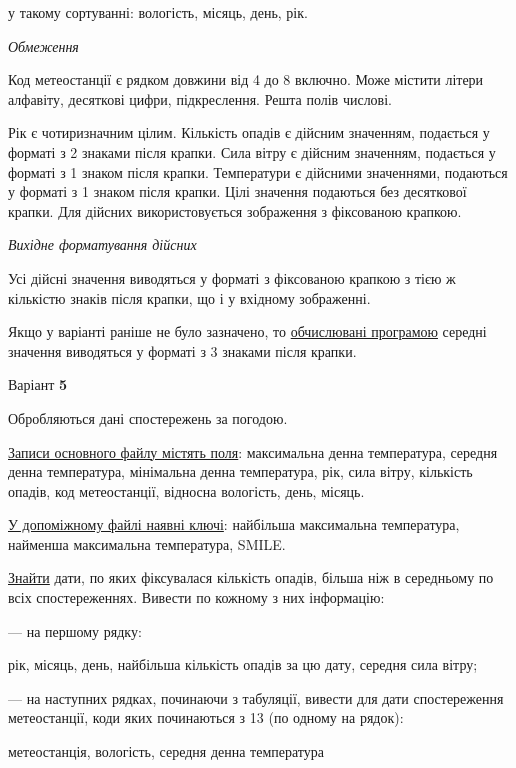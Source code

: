 \documentclass[11pt, ukrainian]{article}
\begin{document}
{\noindent}у такому сортуванні: вологість, місяць, день, рік.


\bigskip\textit{Обмеження}

Код метеостанції є рядком довжини від 4 до 8 включно.
Може містити літери алфавіту, десяткові цифри, підкреслення. Решта полів числові.

Рік є чотиризначним цілим.
Кількість опадів є дійсним значенням, подається у форматі з 2 знаками після крапки.
Сила вітру є дійсним значенням, подається у форматі з 1 знаком після крапки.
Температури є дійсними значеннями, подаються у форматі з 1 знаком після крапки.
Цілі значення подаються без десяткової крапки.
Для дійсних використовується зображення з фіксованою крапкою.

\textit{Вихідне форматування дійсних}

Усі дійсні значення виводяться у форматі з фіксованою крапкою з тією ж кількістю знаків після крапки, що і у вхідному зображенні.

Якщо у варіанті раніше не було зазначено, то \underline{обчислювані програмою} середні значення виводяться у форматі з 3 знаками після крапки.


\par
\newpage
{\center Варіант  \No \textbf { 5 }\par}
\bigskip
Обробляються дані спостережень за погодою. 

\underline{Записи основного файлу містять поля}: максимальна денна температура, середня денна температура, мінімальна денна температура, рік, сила вітру, кількість опадів, код метеостанції, відносна вологість, день, місяць.

\underline{У допоміжному файлі наявні ключі}: найбільша максимальна температура, найменша максимальна температура, SMILE.

\underline{Знайти} дати, по яких фіксувалася кількість опадів, більша ніж в середньому по всіх спостереженнях. Вивести по кожному з них інформацію:\par
{\noindent}--- на першому рядку:\par
рік, місяць, день, найбільша кількість опадів за цю дату, середня сила вітру;

{\noindent}--- на наступних рядках, починаючи з табуляції, вивести для дати спостереження метеостанції, коди яких починаються з 13 (по одному на рядок):\par
метеостанція, вологість, середня денна температура
\end{document}
